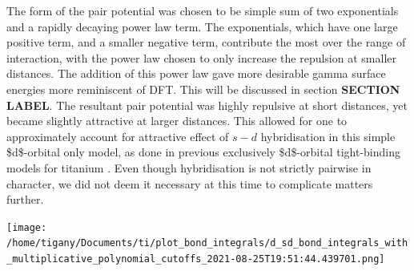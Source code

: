 \documentclass[a4paper,11pt]{article}
\numberwithin{equation}{chapter}
\numberwithin{listing}{chapter}
\begin{document}
The form of the pair potential was chosen to be simple sum of two
exponentials and a rapidly decaying power law term. The exponentials,
which have one large positive term, and a smaller negative term,
contribute the most over the range of interaction, with the power
law chosen to only increase the repulsion at smaller distances. The
addition of this power law gave more desirable gamma surface
energies more reminiscent of DFT. This will be discussed in section
\textbf{SECTION LABEL}. The resultant pair potential was highly repulsive
at short distances, yet became slightly
attractive at larger distances. This allowed for one to
approximately account for attractive effect of \(s-d\) hybridisation
in this simple \$d\$-orbital only model, as done
in previous exclusively \$d\$-orbital tight-binding models for
titanium \cite{Girshick1998a}. Even though hybridisation is
not strictly pairwise in character, we did not deem it necessary at
this time to complicate matters further.


\begin{center}
\texttt{[image: /home/tigany/Documents/ti/plot\_bond\_integrals/d\_sd\_bond\_integrals\_with\_multiplicative\_polynomial\_cutoffs\_2021-08-25T19:51:44.439701.png]}
\label{org0919e36}
\end{center}
\end{document}

